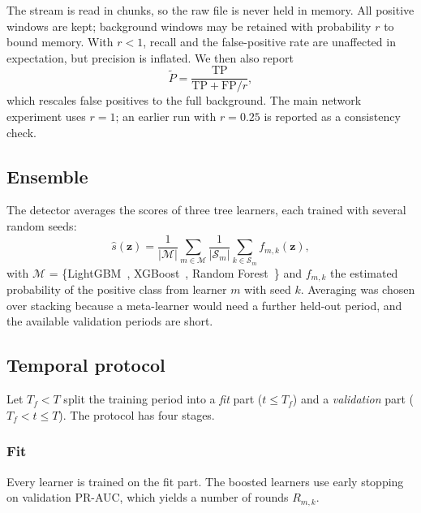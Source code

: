 The stream is read in chunks, so the raw file is never held in memory. All positive windows are kept; background windows may be retained with probability $r$ to bound memory. With $r < 1$, recall and the false-positive rate are unaffected in expectation, but precision is inflated. We then also report
\begin{equation}\label{eq:padj}
\tilde{P} = \frac{\mathrm{TP}}{\mathrm{TP} + \mathrm{FP}/r} ,
\end{equation}
which rescales false positives to the full background. The main network experiment uses $r = 1$; an earlier run with $r = 0.25$ is reported as a consistency check.

\subsection{Ensemble}\label{sec:method-ens}
The detector averages the scores of three tree learners, each trained with several random seeds:
\begin{equation}\label{eq:ens}
\hat{s}(\mathbf{z}) = \frac{1}{|\mathcal{M}|} \sum_{m \in \mathcal{M}} \frac{1}{|\mathcal{S}_m|} \sum_{k \in \mathcal{S}_m} f_{m,k}(\mathbf{z}),
\end{equation}
with $\mathcal{M}$ = \{LightGBM~\cite{ke2017}, XGBoost~\cite{chen2016}, Random Forest~\cite{breiman2001}\} and $f_{m,k}$ the estimated probability of the positive class from learner $m$ with seed $k$. Averaging was chosen over stacking because a meta-learner would need a further held-out period, and the available validation periods are short.

\subsection{Temporal protocol}\label{sec:method-protocol}
Let $T_f < T$ split the training period into a \emph{fit} part ($t \le T_f$) and a \emph{validation} part ($T_f < t \le T$). The protocol has four stages.

\subsubsection{Fit} Every learner is trained on the fit part. The boosted learners use early stopping on validation PR-AUC, which yields a number of rounds $R_{m,k}$.

